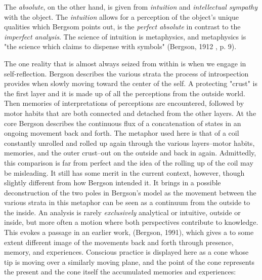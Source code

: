 \documentclass[11pt]{article}
\makeatletter
\newcommand{\cslcitation}[2]
 {\protect\hyper@linkstart{cite}{citeproc_bib_item_#1}#2\hyper@linkend}
\makeatother
\begin{document}
The \emph{absolute}, on the other hand, is given from \emph{intuition} and \emph{intellectual sympathy} with the object.
The \emph{intuition} allows for a perception of the object's unique qualities which Bergsom points out, is the \emph{perfect absolute} in contrast to the \emph{imperfect analysis}.
The science of intuition is metaphysics, and metaphysics is "the science which claims to dispense with symbols" (\cslcitation{2}{Bergson, 1912} , p. 9).

The one reality that is almost always seized from within is when we engage in self-reflection.
Bergson describes the various strata the process of introspection provides when slowly moving toward the center of the self.
A protecting "crust" is the first layer and it is made up of all the perceptions from the outside world.
Then memories of interpretations of perceptions are encountered, followed by motor habits that are both connected and detached from the other layers.
At the core Bergson describes the continuous flux of a concatenation of states in an ongoing movement back and forth.
The metaphor used here is that of a coil constantly unrolled and rolled up again through the various layers--motor habits, memories, and the outer crust--out on the outside and back in again.
Admittedly, this comparison is far from perfect and the idea of the rolling up of the coil may be misleading.
It still has some merit in the current context, however, though slightly different from how Bergson intended it.
It brings in a possible deconstruction of the two poles in Bergson's model as the movement between the various strata in this metaphor can be seen as a continuum from the outside to the inside.
An analysis is rarely \emph{exclusively} analytical or intuitive, outside or inside, but more often a motion where both perspectives contribute to knowledge. 
This evokes a passage in an earlier work, (\cslcitation{3}{Bergson, 1991}), which gives a to some extent different image of the movements back and forth through presence, memory, and experiences.
Conscious practice is displayed here as a cone whose tip is moving over a similarly moving plane, and the point of the cone represents the present and the cone itself the accumulated memories and experiences: 
\end{document}
